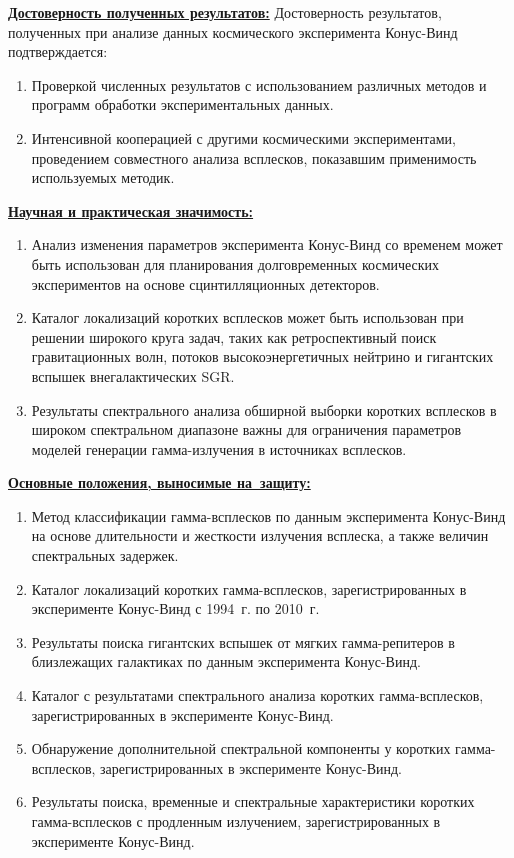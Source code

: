 \underline{\textbf{Достоверность полученных результатов:}}
Достоверность результатов, полученных при анализе данных космического
эксперимента Конус-Винд подтверждается:
\begin{enumerate}
\item Проверкой численных результатов с использованием различных методов и 
программ обработки экспериментальных данных.
\item Интенсивной кооперацией с другими космическими экспериментами,
проведением совместного анализа всплесков, показавшим применимость используемых методик.
\end{enumerate}

\underline{\textbf{Научная и практическая значимость:}} 
\begin{enumerate}
\item Анализ изменения параметров эксперимента Конус-Винд со временем может быть использован
 для планирования долговременных космических экспериментов на основе сцинтилляционных детекторов.
\item Каталог локализаций коротких всплесков может быть использован при решении 
 широкого круга задач, таких как ретроспективный поиск гравитационных волн, потоков высокоэнергетичных нейтрино 
 и гигантских вспышек внегалактических SGR.
\item Результаты спектрального анализа обширной выборки коротких всплесков 
в широком спектральном диапазоне важны для ограничения параметров
моделей генерации гамма-излучения в источниках всплесков.
\end{enumerate}

\clearpage

\underline{\textbf{Основные положения, выносимые на~защиту:}}
\begin{enumerate}
\item Метод классификации гамма-всплесков по данным эксперимента Конус-Винд на основе
    длительности и жесткости излучения всплеска, а также величин спектральных задержек.
\item Каталог локализаций коротких гамма-всплесков, зарегистрированных в эксперименте
    Конус-Винд с 1994~г. по 2010~г.
\item Результаты поиска гигантских вспышек от мягких гамма-репитеров 
    в близлежащих галактиках по данным эксперимента Конус-Винд. 
\item Каталог с результатами спектрального анализа коротких гамма-всплесков, 
    зарегистрированных в эксперименте Конус-Винд.
\item Обнаружение дополнительной спектральной компоненты у коротких гамма-всплесков, 
    зарегистрированных в эксперименте Конус-Винд.
\item Результаты поиска, временные и спектральные характеристики коротких гамма-всплесков 
    с продленным излучением, зарегистрированных в эксперименте Конус-Винд.
\end{enumerate}


